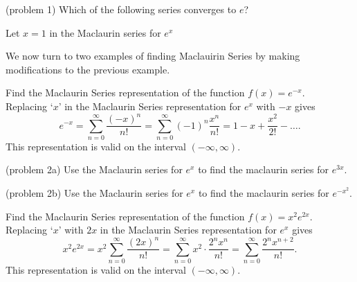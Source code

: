 \documentclass{ximera}
\begin{document}
\begin{problem}(problem 1)
Which of the following series converges to $e$?
\begin{hint}
Let $x = 1$ in the Maclaurin series for $e^x$
\end{hint}

\begin{multipleChoice}
\end{multipleChoice}
\end{problem}

We now turn to two examples of finding Maclauirin Series by making modifications to the previous example.

\begin{example}[example 2] 
Find the Maclaurin Series representation of the function $f(x) = e^{-x}$.\\
Replacing `$x$' in the Maclaurin Series representation for $e^x$ with $-x$ gives
\[
e^{-x} = \sum_{n=0}^\infty \frac{(-x)^n}{n!} = \sum_{n=0}^\infty (-1)^n \frac{x^n}{n!} = 1 - x + \frac{x^2}{2!} - \dots.
\]
This representation is valid on the interval $(-\infty, \infty)$.
\end{example}

\begin{problem}(problem 2a)
Use the Maclaurin series for $e^x$ to find the maclaurin series for $e^{3x}$.
\begin{multipleChoice}
\end{multipleChoice}
\end{problem}


\begin{problem}(problem 2b)
Use the Maclaurin series for $e^x$ to find the maclaurin series for $e^{-x^2}$.
\begin{multipleChoice}
\end{multipleChoice}
\end{problem}

\begin{example}[example 3] 
Find the Maclaurin Series representation of the function $f(x) = x^2 e^{2x}$.\\
Replacing `$x$' with $2x$ in the Maclaurin Series representation for $e^x$ gives
\[
x^2 e^{2x} = x^2\sum_{n=0}^\infty \frac{(2x)^n}{n!} = \sum_{n=0}^\infty x^2 \cdot \frac{2^n x^n}{n!} = \sum_{n=0}^\infty \frac{2^n x^{n+2}}{n!}.
\]
This representation is valid on the interval $(-\infty, \infty)$.
\end{example}
\end{document}
